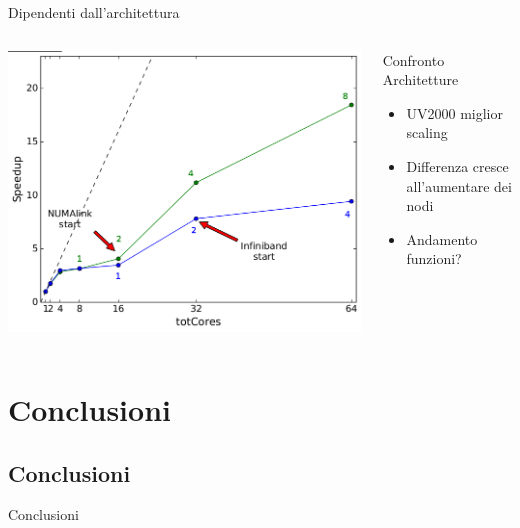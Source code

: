 \documentclass[8pt]{beamer}
\begin{document}
\begin{frame}{Dipendenti dall'architettura}
\begin{columns}
			\includegraphics[width=1\textwidth]{beam_arch_global.jpg}			
		\begin{block}{Confronto Architetture}
			\begin{itemize}
				\item UV2000 miglior scaling
				\item Differenza cresce all'aumentare dei nodi
				\item Andamento funzioni?		
			\end{itemize}
		\end{block}
\end{columns}
\end{frame}





\section{Conclusioni}
\subsection{Conclusioni}

\begin{frame}{Conclusioni}


\end{frame}
\end{document}
